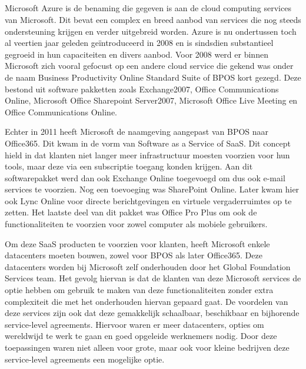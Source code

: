 \subsection{}%
\label{sec:Microsoft Azure}

Microsoft Azure is de benaming die gegeven is aan de cloud computing services van Microsoft. Dit bevat een complex en breed aanbod van services die nog steeds ondersteuning krijgen en verder uitgebreid worden. Azure is nu ondertussen toch al veertien jaar geleden geïntroduceerd in 2008 en is sindsdien substantieel gegroeid in hun capaciteiten en divers aanbod. Voor 2008 werd er binnen Microsoft zich vooral gefocust op een andere cloud service die gekend was onder de naam Business Productivity Online Standard Suite of BPOS kort gezegd. Deze bestond uit software pakketten zoals Exchange2007, Office Communications Online, Microsoft Office Sharepoint Server2007, Microsoft Office Live Meeting en Office Communications Online.

Echter in 2011 heeft Microsoft de naamgeving aangepast van BPOS naar Office365. Dit kwam in de vorm van Software as a Service of SaaS. Dit concept hield in dat klanten niet langer meer infrastructuur moesten voorzien voor hun tools, maar deze via een subscriptie toegang konden krijgen. Aan dit softwarepakket werd dan ook Exchange Online toegevoegd om dus ook e-mail services te voorzien. Nog een toevoeging was SharePoint Online. Later kwam hier ook Lync Online voor directe berichtgevingen en virtuele vergaderruimtes op te zetten. Het laatste deel van dit pakket was Office Pro Plus om ook de functionaliteiten te voorzien voor zowel computer als mobiele gebruikers.

Om deze SaaS producten te voorzien voor klanten, heeft Microsoft enkele datacenters moeten bouwen, zowel voor BPOS als later Office365. Deze datacenters worden bij Microsoft zelf onderhouden door het Global Foundation Services team. Het gevolg hiervan is dat de klanten van deze Microsoft services de optie hebben om gebruik te maken van deze functionaliteiten zonder extra complexiteit die met het onderhouden hiervan gepaard gaat. De voordelen van deze services zijn ook dat deze gemakkelijk schaalbaar, beschikbaar en bijhorende service-level agreements. Hiervoor waren er meer datacenters, opties om wereldwijd te werk te gaan en goed opgeleide werknemers nodig. Door deze toepassingen waren niet alleen voor grote, maar ook voor kleine bedrijven deze service-level agreements een mogelijke optie.

